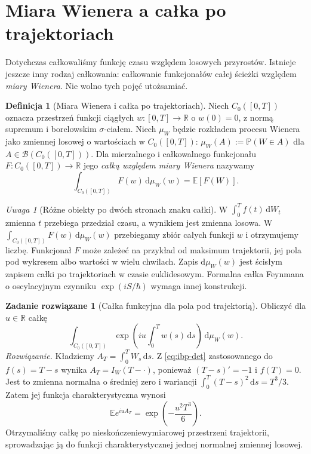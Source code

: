 \documentclass[11pt,a4paper,oneside]{report}
\numberwithin{equation}{chapter}
\theoremstyle{plain}
\theoremstyle{definition}
\newtheorem{definicja}{Definicja}[chapter]
\newtheorem{zadanie}{Zadanie rozwiązane}[chapter]
\theoremstyle{remark}
\newtheorem{uwaga}{Uwaga}[chapter]
\newcommand{\R}{\mathbb{R}}
\newcommand{\Prob}{\mathbb{P}}
\newcommand{\E}{\mathbb{E}}
\newcommand{\calB}{\mathcal{B}}
\newcommand{\dd}{\mathrm{d}}
\begin{document}
\section{Miara Wienera a całka po trajektoriach}\label{sec:volIII:01:06}
Dotychczas całkowaliśmy funkcję czasu względem losowych
przyrostów. Istnieje jeszcze inny rodzaj całkowania:
całkowanie funkcjonałów całej ścieżki względem \emph{miary
Wienera}. Nie wolno tych pojęć utożsamiać.

\begin{definicja}[Miara Wienera i całka po trajektoriach]\label{def:volIII:01:04}
Niech $C_0([0,T])$ oznacza przestrzeń funkcji ciągłych
$w:[0,T]\to\R$ o $w(0)=0$, z normą supremum i borelowskim
$\sigma$-ciałem. Niech $\mu_W$ będzie rozkładem procesu Wienera
jako zmiennej losowej o wartościach w $C_0([0,T])$:
$\mu_W(A):=\Prob(W\in A)$ dla $A\in\calB(C_0([0,T]))$.
Dla mierzalnego i całkowalnego funkcjonału
$F:C_0([0,T])\to\R$ jego \emph{całką względem miary Wienera}
nazywamy
\[
\int_{C_0([0,T])}F(w)\,\dd\mu_W(w)=\E[F(W)].
\tag{1.7}
\]
\end{definicja}

\begin{uwaga}[Różne obiekty po dwóch stronach znaku całki]
W $\int_0^Tf(t)\,\dd W_t$ zmienna $t$ przebiega przedział
czasu, a wynikiem jest zmienna losowa. W
$\int_{C_0([0,T])}F(w)\,\dd\mu_W(w)$ przebiegamy zbiór
całych funkcji $w$ i otrzymujemy liczbę. Funkcjonał $F$
może zależeć na przykład od maksimum trajektorii,
jej pola pod wykresem albo wartości w wielu chwilach.
Zapis $\dd\mu_W(w)$ jest ścisłym zapisem całki po trajektoriach
w czasie euklidesowym. Formalna całka Feynmana o oscylacyjnym
czynniku $\exp(iS/\hbar)$ wymaga innej konstrukcji.
\end{uwaga}

\begin{zadanie}[Całka funkcyjna dla pola pod trajektorią]\label{zad:area-char}
Obliczyć dla $u\in\R$ całkę
\[
\int_{C_0([0,T])}
\exp\left(iu\int_0^T w(s)\,\dd s\right)\,\dd\mu_W(w).
\]
\emph{Rozwiązanie.}
Kładziemy $A_T=\int_0^TW_s\,\dd s$.
Z \eqref{eq:ibp-det} zastosowanego do $f(s)=T-s$
wynika $A_T=I_W(T-\cdot)$, ponieważ $(T-s)'=-1$
i $f(T)=0$. Jest to zmienna normalna o średniej zero
i wariancji
$\int_0^T(T-s)^2\,\dd s=T^3/3$.
Zatem jej funkcja charakterystyczna wynosi
\[
\E e^{iuA_T}=\exp\left(-\frac{u^2T^3}{6}\right).
\]
Otrzymaliśmy całkę po nieskończeniewymiarowej przestrzeni
trajektorii, sprowadzając ją do funkcji charakterystycznej
jednej normalnej zmiennej losowej.
\end{zadanie}
\end{document}
